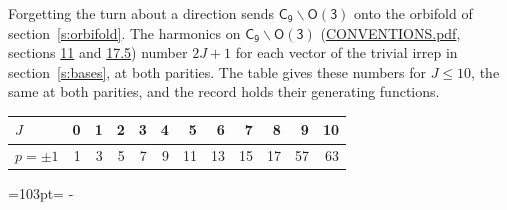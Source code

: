 \documentclass[10pt,a4paper]{article}
\newcommand{\needspace}[1]{\par\penalty-100\begingroup\dimen0=#1\relax\dimen2=\pagegoal
  \advance\dimen2-\pagetotal\ifdim\dimen0>\dimen2\relax\ifdim\dimen2>0pt\vfil\break\fi\fi
  \endgroup}
\numberwithin{equation}{section}
\newcommand{\grp}[1]{\mathsf{#1}}
\begin{document}
Forgetting the turn about a direction sends $\grp{C_{9}}\backslash\grp{O(3)}$ onto the orbifold of section~\ref{s:orbifold}.
The harmonics on $\grp{C_{9}}\backslash\grp{O(3)}$ (\href{../../CONVENTIONS.pdf}{CONVENTIONS.pdf}, sections \href{../../CONVENTIONS.pdf\#conv.11}{11} and \href{../../CONVENTIONS.pdf\#conv.17.5}{17.5}) number $2J + 1$ for each vector of the trivial irrep in section~\ref{s:bases}, at both parities. The table gives these numbers for $J \le 10$, the same at both parities, and the record holds their generating functions.
{\small\setlength{\tabcolsep}{4pt}\begin{longtable}{@{}lrrrrrrrrrrr@{}}\toprule
$J$ & 0 & 1 & 2 & 3 & 4 & 5 & 6 & 7 & 8 & 9 & 10\\\midrule\endhead
\bottomrule\endfoot\endlastfoot
$p = \pm 1$ & 1 & 3 & 5 & 7 & 9 & 11 & 13 & 15 & 17 & 57 & 63\\
\bottomrule\end{longtable}}
\needspace{103pt}
\end{document}
